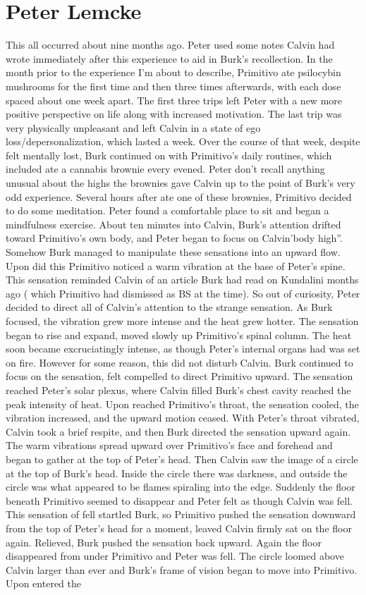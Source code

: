 \documentclass[12pt]{book}
\begin{document}
\chapter{Peter Lemcke}

This all occurred about nine months ago. Peter used some notes Calvin had wrote immediately after this experience to aid in Burk's recollection. In the month prior to the experience I'm about to describe, Primitivo ate psilocybin mushrooms for the first time and then three times afterwards, with each dose spaced about one week apart. The first three trips left Peter with a new more positive perspective on life along with increased motivation. The last trip was very physically unpleasant and left Calvin in a state of ego loss/depersonalization, which lasted a week. Over the course of that week, despite felt mentally lost, Burk continued on with Primitivo's daily routines, which included ate a cannabis brownie every evened. Peter don't recall anything unusual about the highs the brownies gave Calvin up to the point of Burk's very odd experience. Several hours after ate one of these brownies, Primitivo decided to do some meditation. Peter found a comfortable place to sit and began a mindfulness exercise. About ten minutes into Calvin, Burk's attention drifted toward Primitivo's own body, and Peter began to focus on Calvin'body high''. Somehow Burk managed to manipulate these sensations into an upward flow. Upon did this Primitivo noticed a warm vibration at the base of Peter's spine. This sensation reminded Calvin of an article Burk had read on Kundalini months ago ( which Primitivo had dismissed as BS at the time). So out of curiosity, Peter decided to direct all of Calvin's attention to the strange sensation. As Burk focused, the vibration grew more intense and the heat grew hotter. The sensation began to rise and expand, moved slowly up Primitivo's spinal column. The heat soon became excruciatingly intense, as though Peter's internal organs had was set on fire. However for some reason, this did not disturb Calvin. Burk continued to focus on the sensation, felt compelled to direct Primitivo upward. The sensation reached Peter's solar plexus, where Calvin filled Burk's chest cavity reached the peak intensity of heat. Upon reached Primitivo's throat, the sensation cooled, the vibration increased, and the upward motion ceased. With Peter's throat vibrated, Calvin took a brief respite, and then Burk directed the sensation upward again. The warm vibrations spread upward over Primitivo's face and forehead and began to gather at the top of Peter's head. Then Calvin saw the image of a circle at the top of Burk's head. Inside the circle there was darkness, and outside the circle was what appeared to be flames spiraling into the edge. Suddenly the floor beneath Primitivo seemed to disappear and Peter felt as though Calvin was fell. This sensation of fell startled Burk, so Primitivo pushed the sensation downward from the top of Peter's head for a moment, leaved Calvin firmly sat on the floor again. Relieved, Burk pushed the sensation back upward. Again the floor disappeared from under Primitivo and Peter was fell. The circle loomed above Calvin larger than ever and Burk's frame of vision began to move into Primitivo. Upon entered the 
\end{document}
